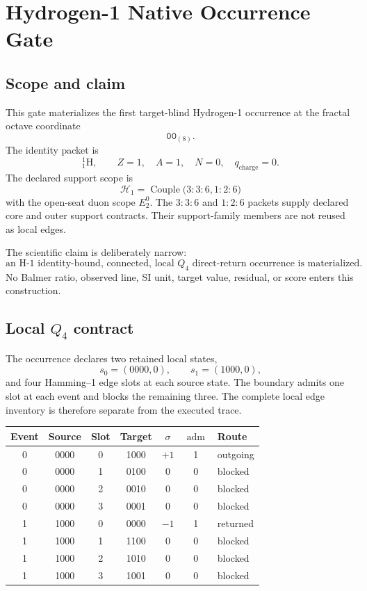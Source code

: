 \section{Hydrogen-1 Native Occurrence Gate}
\label{app:manual1-hydrogen1-native-occurrence}

\subsection{Scope and claim}

This gate materializes the first target-blind Hydrogen-1 occurrence at the
fractal octave coordinate
\[
\mathtt{00}_{(8)}.
\]
The identity packet is
\[
{}^{1}_{1}\mathrm H,
\qquad
Z=1,
\quad
A=1,
\quad
N=0,
\quad
q_{\mathrm{charge}}=0.
\]
The declared support scope is
\[
\boxed{
\mathcal H_1
=
\operatorname{Couple}
\bigl(3{:}3{:}6,1{:}2{:}6\bigr)
}
\]
with the open-seat duon scope \(E_2^0\).  The \(3{:}3{:}6\) and
\(1{:}2{:}6\) packets supply declared core and outer support contracts.  Their
support-family members are not reused as local edges.

The scientific claim is deliberately narrow:
\[
\boxed{
\text{an H-1 identity-bound, connected, local }Q_4
\text{ direct-return occurrence is materialized.}
}
\]
No Balmer ratio, observed line, SI unit, target value, residual, or score enters
this construction.

\subsection{Local \texorpdfstring{\(Q_4\)}{Q4} contract}

The occurrence declares two retained local states,
\[
s_0=(0000,0),
\qquad
s_1=(1000,0),
\]
and four Hamming--1 edge slots at each source state.  The boundary admits one
slot at each event and blocks the remaining three.  The complete local edge
inventory is therefore separate from the executed trace.

\begin{center}
\small
\begin{tabular}{@{}ccccccl@{}}
\toprule
Event & Source & Slot & Target & \(\sigma\) & \(\operatorname{adm}\) & Route \\
\midrule
0 & 0000 & 0 & 1000 & \(+1\) & 1 & outgoing \\
0 & 0000 & 1 & 0100 & 0 & 0 & blocked \\
0 & 0000 & 2 & 0010 & 0 & 0 & blocked \\
0 & 0000 & 3 & 0001 & 0 & 0 & blocked \\
1 & 1000 & 0 & 0000 & \(-1\) & 1 & returned \\
1 & 1000 & 1 & 1100 & 0 & 0 & blocked \\
1 & 1000 & 2 & 1010 & 0 & 0 & blocked \\
1 & 1000 & 3 & 1001 & 0 & 0 & blocked \\
\bottomrule
\end{tabular}
\end{center}

